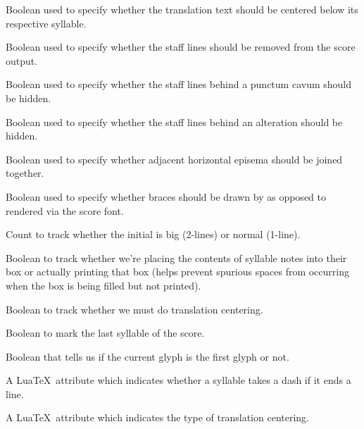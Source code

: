 Boolean used to specify whether the translation text should be centered below its respective syllable.

Boolean used to specify whether the staff lines should be removed from the score output.

Boolean used to specify whether the staff lines behind a punctum cavum should be hidden.

Boolean used to specify whether the staff lines behind an alteration should be hidden.

Boolean used to specify whether adjacent horizontal episema should be joined together.

Boolean used to specify whether braces should be drawn by \MP{} as
opposed to rendered via the score font.

Count to track whether the initial is big (2-lines) or normal (1-line).

Boolean to track whether we're placing the contents of syllable notes into their box or actually printing that box (helps prevent spurious spaces from occurring when the box is being filled but not printed).

Boolean to track whether we must do translation centering.

Boolean to mark the last syllable of the score.

Boolean that tells us if the current glyph is the first glyph or not.

A Lua\TeX\ attribute which indicates whether a syllable takes a dash if it ends a line.  

A Lua\TeX\ attribute which indicates the type of translation centering.

